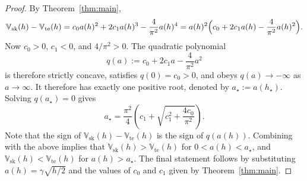 \documentclass[10pt,a4paper]{amsart}
\begin{document}
\begin{proof}
By Theorem~\ref{thm:main},
\[
\mathbb{V}_{\mathrm{sk}}(h)-\mathbb{V}_{\mathrm{te}}(h)
=
c_0 a(h)^2 + 2c_1 a(h)^3 - \frac{4}{\pi^2}a(h)^4
=
a(h)^2\Bigl(c_0 + 2c_1 a(h) - \frac{4}{\pi^2}a(h)^2\Bigr).
\]
Now $c_0>0$, $c_1<0$, and $4/\pi^2>0$. The quadratic polynomial
\[
q(a):=c_0 + 2c_1 a - \frac{4}{\pi^2}a^2
\]
is therefore strictly concave, satisfies $q(0)=c_0>0$, and obeys $q(a)\to -\infty$ as $a\to\infty$. It therefore has exactly one positive root, denoted by $a_\star:= a(h_\star)$. Solving $q(a_\star)=0$ gives
\[
a_\star
=
\frac{\pi^2}{4}
\left(
c_1 + \sqrt{c_1^2 + \frac{4c_0}{\pi^2}}
\right).
\]
Note that the sign of $\mathbb{V}_{\mathrm{sk}}(h)-\mathbb{V}_{\mathrm{te}}(h)$ is the sign of $q(a(h))$. Combining with the above implies that 
$\mathbb{V}_{\mathrm{sk}}(h)>\mathbb{V}_{\mathrm{te}}(h)$
for $0<a(h)<a_\star$,
and
$\mathbb{V}_{\mathrm{sk}}(h)<\mathbb{V}_{\mathrm{te}}(h)$
for $a(h)>a_\star$.
The final statement follows by substituting $a(h)=\gamma\sqrt{h/2}$ and the values of $c_0$ and $c_1$ given by Theorem~\ref{thm:main}.
\end{proof} 
\end{document}
